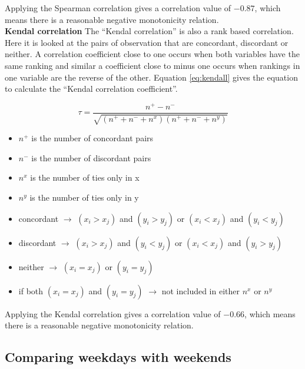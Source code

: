 Applying the Spearman correlation  gives a correlation value of $ -0.87$, which means there is a reasonable negative monotonicity relation.\\

\textbf{Kendal correlation}
The ``Kendal correlation'' is also a rank based correlation. Here it is looked at the pairs of observation that are concordant, discordant or neither. A correlation coefficient close to one occurs when both variables have the same ranking and similar a coefficient close to minus one occurs when rankings in one variable are the reverse of the other. Equation \ref{eq:kendall} gives the equation to calculate the ``Kendal correlation coefficient''.

\begin{equation}\label{eq:kendall}
	\tau = \frac{n^+-n^-}{\sqrt{(n^++n^-+n^x)(n^++n^-+n^y)}}
\end{equation}
\begin{itemize}
	\item $ n^+ $ is the number of concordant pairs
	\item $ n^- $ is the number of discordant pairs
	\item $ n^x $ is the number of ties only in x
	\item $ n^y $ is the number of ties only in y
	\item concordant $\rightarrow $ $ (x_i > x_j ) $ and $ (y_i > y_j ) $ or $ (x_i < x_j ) $ and $ (y_i < y_j ) $
	\item discordant $\rightarrow $ $ (x_i > x_j ) $ and $ (y_i < y_j ) $ or $ (x_i < x_j ) $ and $ (y_i > y_j ) $
	\item neither $\rightarrow $ $ (x_i = x_j ) $ or $ (y_i = y_j ) $
	\item if both $ (x_i = x_j ) $ and $ (y_i = y_j ) $ $\rightarrow $ not included in either $ n^x $ or $ n^y $
\end{itemize}

Applying the Kendal correlation  gives a correlation value of $ -0.66$, which means there is a reasonable negative monotonicity relation.\\



\subsection{Comparing weekdays with weekends}



